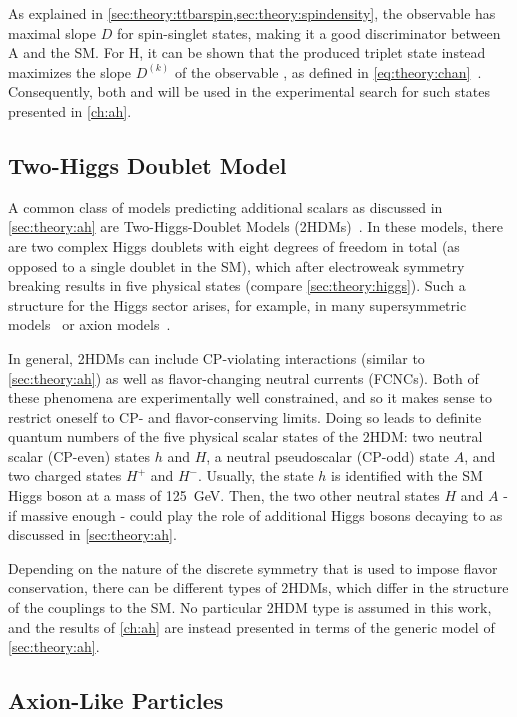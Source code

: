 As explained in \cref{sec:theory:ttbarspin,sec:theory:spindensity}, the observable \chel has maximal slope $D$ for spin-singlet states, making it a good discriminator between A and the SM. For H, it can be shown that the produced triplet state instead maximizes the slope $D^{(k)}$ of the observable \chan, as defined in \cref{eq:theory:chan}~\cite{Maltoni:2024tul}. Consequently, both \chel and \chan will be used in the experimental search for such states presented in \cref{ch:ah}.

\subsection{Two-Higgs Doublet Model}
\label{sec:theory:twohdm}

A common class of models predicting additional scalars as discussed in \cref{sec:theory:ah} are Two-Higgs-Doublet Models (2HDMs)~\cite{Lee:1973iz,Branco:2011iw}. In these models, there are two complex Higgs doublets with eight degrees of freedom in total (as opposed to a single doublet in the SM), which after electroweak symmetry breaking results in five physical states (compare \cref{sec:theory:higgs}). Such a structure for the Higgs sector arises, for example, in many supersymmetric models~\cite{Haber:1984rc} or axion models~\cite{Kim:1986ax}.

In general, 2HDMs can include CP-violating interactions (similar to \cref{sec:theory:ah}) as well as flavor-changing neutral currents (FCNCs). Both of these phenomena are experimentally well constrained, and so it makes sense to restrict oneself to CP- and flavor-conserving limits. Doing so leads to definite quantum numbers of the five physical scalar states of the 2HDM: two neutral scalar (CP-even) states $h$ and $H$, a neutral pseudoscalar (CP-odd) state $A$, and two charged states $H^+$ and $H^-$. Usually, the state $h$ is identified with the SM Higgs boson at a mass of \SI{125}{\GeV}. Then, the two other neutral states $H$ and $A$ - if massive enough - could play the role of additional Higgs bosons decaying to \ttbar as discussed in \cref{sec:theory:ah}.

Depending on the nature of the discrete symmetry that is used to impose flavor conservation, there can be different types of 2HDMs, which differ in the structure of the couplings to the SM. No particular 2HDM type is assumed in this work, and the results of \cref{ch:ah} are instead presented in terms of the generic model of \cref{sec:theory:ah}.

\subsection{Axion-Like Particles}
\label{sec:theory:alps}

